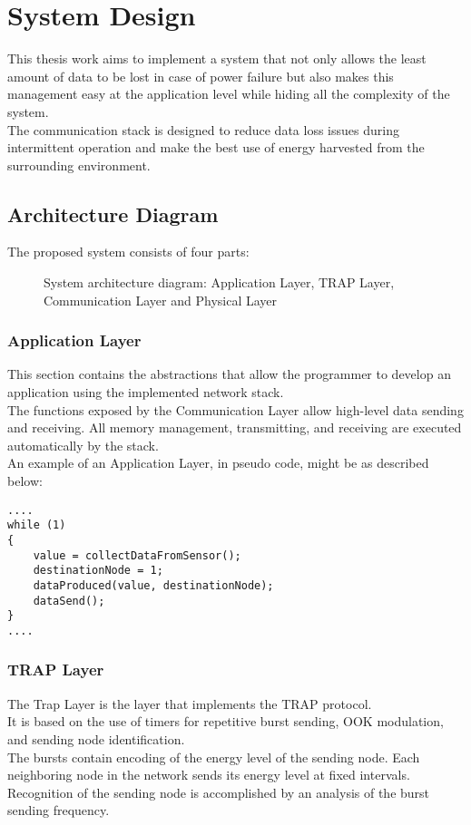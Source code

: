 \chapter{System Design}
\label{cha:System Architecture}
This thesis work aims to implement a system that not only allows the least amount of data to be lost in case of power failure but also makes this management easy at the application level while hiding all the complexity of the system.\\
The communication stack is designed to reduce data loss issues during intermittent operation and make the best use of energy harvested from the surrounding environment.
\section{Architecture Diagram}
\label{sec:Architecture diagram}
The proposed system consists of four parts: \\
  \begin{figure}[H]
    \centerline{}
    \caption{\footnotesize \centering System architecture diagram: Application Layer, TRAP Layer, Communication Layer and Physical Layer}
    \label{fig:SystemArchitectureDiagram}
  \end{figure}
 \subsection{Application Layer}
This section contains the abstractions that allow the programmer to develop an application using the implemented network stack.\\
The functions exposed by the Communication Layer allow high-level data sending and receiving. All memory management, transmitting, and receiving are executed automatically by the stack.\\
An example of an Application Layer, in pseudo code, might be as described below:\\
\begin{lstlisting}
....
while (1)
{
    value = collectDataFromSensor();
    destinationNode = 1;
    dataProduced(value, destinationNode);
    dataSend();
}
....
\end{lstlisting}
\subsection{TRAP Layer}
The Trap Layer is the layer that implements the TRAP protocol.\\
It is based on the use of timers for repetitive burst sending, OOK modulation, and sending node identification.\\
The bursts contain encoding of the energy level of the sending node. Each neighboring node in the network sends its energy level at fixed intervals.\\
Recognition of the sending node is accomplished by an analysis of the burst sending frequency.\\
